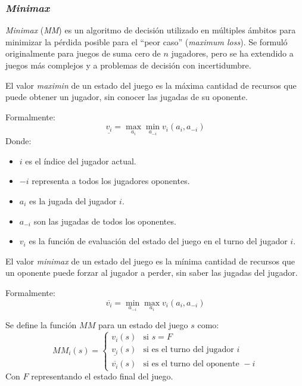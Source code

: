 \subsubsection{\textit{Minimax}}
  \textit{Minimax}\cite{noauthor_minimax_nodate, fan_minimax_1953} (\textit{MM}) es un 
  algoritmo de decisión utilizado en múltiples ámbitos para minimizar la pérdida posible para 
  el \enquote{peor caso} (\textit{maximum loss}). 
  Se formuló originalmente para juegos de suma cero de \(n\) jugadores, pero se ha extendido a
  juegos más complejos y a problemas de decisión con incertidumbre.

  \begin{definition}
    El valor \textit{maximin} de un estado del juego es la máxima cantidad de recursos que puede 
    obtener un jugador, sin conocer las jugadas de su oponente.

    Formalmente:
    \[
      \underline{v_{i}} = \max_{a_{i}}\min_{a_{-i}}v_{i}(a_{i},a_{-i})
    \]
    Donde:
    \begin{itemize}
      \item \(i\) es el índice del jugador actual.
      \item \(-i\) representa a todos los jugadores oponentes.
      \item \(a_i\) es la jugada del jugador \(i\).
      \item \(a_{-i}\) son las jugadas de todos los oponentes.
      \item \(v_i\) es la función de evaluación del estado del juego en el turno del jugador 
        \(i\).
    \end{itemize}
  \end{definition}

  \begin{definition}
    El valor \textit{minimax} de un estado del juego es la mínima cantidad de recursos que un 
    oponente puede forzar al jugador a perder, sin saber las jugadas del jugador.
    
    Formalmente:
    \[
      \overline{v_{i}} = 
        \min_{a_{-i}}\max_{a_{i}}{v_{i}(a_{i}, a_{-i})}
    \]
  \end{definition}

  \begin{definition}
    Se define la función \(MM\) para un estado del juego \(s\) como:
    \[
      MM_i(s) = \begin{cases}
        v_i(s) & \text{si } s = F  \\
        \underline{v_{i}}(s) & \text{si es el turno del jugador } i \\
        \overline{v_{i}}(s) & \text{si es el turno del oponente } -i
      \end{cases}  
    \]
    Con \(F\) representando el estado final del juego.
  \end{definition}

